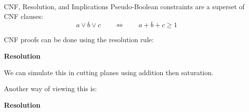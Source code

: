 \documentclass[aspectratio=169,compress,10pt]{beamer}
\begin{document}
\begin{frame}{CNF, Resolution, and Implications}
    Pseudo-Boolean constraints are a superset of CNF clauses:
    \begin{equation*}
        a \lor \overline{b} \lor c \qquad \Leftrightarrow \qquad a + \overline{b} + c \ge 1
    \end{equation*}

    CNF proofs can be done using the resolution rule:\bigskip

    \begin{minipage}[c]{0.35\framewidth}
        \textcolor{uofgcobalt}{\textbf{Resolution}}
    \end{minipage}\hfill\begin{minipage}[c]{0.60\framewidth}\begin{prooftree}
    \end{prooftree}\end{minipage}\bigskip

    We can simulate this in cutting planes using addition then saturation.

    \pause
    \bigskip

    Another way of viewing this is:\bigskip

    \begin{minipage}[c]{0.35\framewidth}
        \textcolor{uofgcobalt}{\textbf{Resolution}}
    \end{minipage}\hfill\begin{minipage}[c]{0.60\framewidth}\begin{prooftree}
    \end{prooftree}\end{minipage}
\end{frame}
\end{document}
